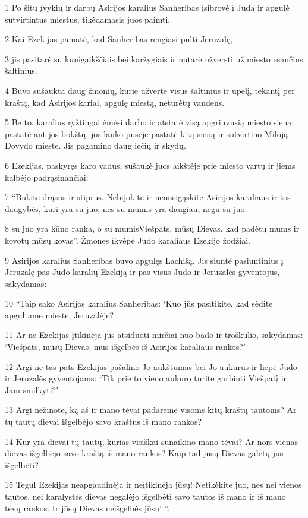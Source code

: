\par 1 Po šitų įvykių ir darbų Asirijos karalius Sanheribas įsibrovė į Judą ir apgulė sutvirtintus miestus, tikėdamasis juos paimti. 
\par 2 Kai Ezekijas pamatė, kad Sanheribas rengiasi pulti Jeruzalę, 
\par 3 jis pasitarė su kunigaikščiais bei karžygiais ir nutarė užversti už miesto esančius šaltinius. 
\par 4 Buvo sušaukta daug žmonių, kurie užvertė visus šaltinius ir upelį, tekantį per kraštą, kad Asirijos kariai, apgulę miestą, neturėtų vandens. 
\par 5 Be to, karalius ryžtingai ėmėsi darbo ir atstatė visą apgriuvusią miesto sieną; pastatė ant jos bokštų, jos lauko pusėje pastatė kitą sieną ir sutvirtino Miloją Dovydo mieste. Jis pagamino daug iečių ir skydų. 
\par 6 Ezekijas, paskyręs karo vadus, sušaukė juos aikštėje prie miesto vartų ir jiems kalbėjo padrąsinančiai: 
\par 7 “Būkite drąsūs ir stiprūs. Nebijokite ir nenusigąskite Asirijos karaliaus ir tos daugybės, kuri yra su juo, nes su mumis yra daugiau, negu su juo: 
\par 8 su juo yra kūno ranka, o su mumis­Viešpats, mūsų Dievas, kad padėtų mums ir kovotų mūsų kovas”. Žmones įkvėpė Judo karaliaus Ezekijo žodžiai. 
\par 9 Asirijos karalius Sanheribas buvo apgulęs Lachišą. Jis siuntė pasiuntinius į Jeruzalę pas Judo karalių Ezekiją ir pas visus Judo ir Jeruzalės gyventojus, sakydamas: 
\par 10 “Taip sako Asirijos karalius Sanheribas: ‘Kuo jūs pasitikite, kad sėdite apgultame mieste, Jeruzalėje? 
\par 11 Ar ne Ezekijas įtikinėja jus atsiduoti mirčiai nuo bado ir troškulio, sakydamas: ‘Viešpats, mūsų Dievas, mus išgelbės iš Asirijos karaliaus rankos?’ 
\par 12 Argi ne tas pats Ezekijas pašalino Jo aukštumas bei Jo aukurus ir liepė Judo ir Jeruzalės gyventojams: ‘Tik prie to vieno aukuro turite garbinti Viešpatį ir Jam smilkyti?’ 
\par 13 Argi nežinote, ką aš ir mano tėvai padarėme visoms kitų kraštų tautoms? Ar tų tautų dievai išgelbėjo savo kraštus iš mano rankos? 
\par 14 Kur yra dievai tų tautų, kurias visiškai sunaikino mano tėvai? Ar nors vienas dievas išgelbėjo savo kraštą iš mano rankos? Kaip tad jūsų Dievas galėtų jus išgelbėti? 
\par 15 Tegul Ezekijas neapgaudinėja ir neįtikinėja jūsų! Netikėkite juo, nes nei vienos tautos, nei karalystės dievas negalėjo išgelbėti savo tautos iš mano ir iš mano tėvų rankos. Ir jūsų Dievas neišgelbės jūsų’ ”. 
